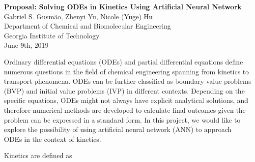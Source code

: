 \documentclass[12pt, letterpaper]{article}
\begin{document}
\begin{center}
    \Large \textbf{Proposal: Solving ODEs in Kinetics Using Artificial Neural Network \\}
    \vspace{0.5em}
    \normalsize Gabriel S. Gusm\~{a}o\textsuperscript{\textdagger}, Zhenyi Yu\textsuperscript{\textdagger}, Nicole (Yuge) Hu\textsuperscript{\textdagger}\\ 
    \vspace{0.2em}
    \textsuperscript{\textdagger}Department of Chemical and Biomolecular Engineering \\ Georgia Institute of Technology \\
    \vspace{0.2em}
    June 9th, 2019 \\
\end{center}

Ordinary differential equations (ODEs) and partial differential equations define numerous questions in the field of chemical engineering spanning from kinetics to transport phenomena. ODEs can be further classified as boundary value problems (BVP) and initial value problems (IVP) in different contexts. Depending on the specific equations, ODEs might not always have explicit analytical solutions, and therefore numerical methods are developed to calculate final outcomes given the problem can be expressed in a standard form. In this project, we would like to explore the possibility of using artificial neural network (ANN) to approach ODEs in the context of kinetics. 

Kinetics are defined as 
\end{document}

